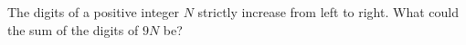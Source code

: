 The digits of a positive integer $N$ strictly increase from left to right. What could the sum of the digits of $9N$ be?
